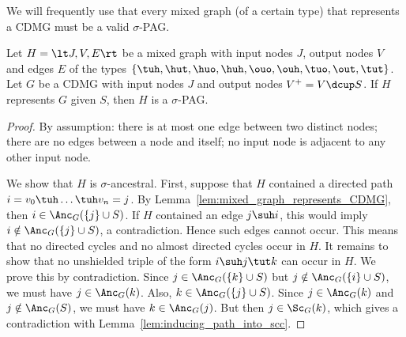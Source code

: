 We will frequently use that every mixed graph (of a certain type) that represents a CDMG must be a valid $\sigma$-PAG.
\begin{Prp}\label{prp:sigmapag_represents_cdmg_is_valid}
  Let $H = \lt J,V,E\rt$ be a mixed graph with input nodes $J$, output nodes $V$ and edges $E$ of the types $\{\tuh,\hut,\huo,\huh,\ouo,\ouh,\tuo,\out,\tut\}$.
  Let $G$ be a CDMG with input nodes $J$ and output nodes $V^+ = V \dcup S$.
  If $H$ represents $G$ given $S$, then $H$ is a $\sigma$-PAG.
\end{Prp}
\begin{proof}
  By assumption: there is at most one edge between two distinct nodes; there are no edges between a node and itself;
  no input node is adjacent to any other input node. 
  
  We show that $H$ is $\sigma$-ancestral. 
  First, suppose that $H$ contained a directed path $i = v_0 \tuh \dots \tuh v_n = j$.
  By Lemma~\ref{lem:mixed_graph_represents_CDMG}, then $i \in \Anc_G(\{j\} \cup S)$.
  If $H$ contained an edge $j \suh i$, this would imply $i \notin \Anc_G(\{j\} \cup S)$, a contradiction. 
  Hence such edges cannot occur.
  This means that no directed cycles and no almost directed cycles occur in $H$.
  It remains to show that no unshielded triple of the form $i \suh j \tut k$ can occur in $H$.
  We prove this by contradiction.
  Since $j \in \Anc_G(\{k\} \cup S)$ but $j \notin \Anc_G(\{i\} \cup S)$, we must have $j \in \Anc_G(k)$.
  Also, $k \in \Anc_G(\{j\} \cup S)$.
  Since $j \in \Anc_G(k)$ and $j \notin \Anc_G(S)$, we must have $k \in \Anc_G(j)$.
  But then $j \in \Sc_G(k)$, which gives a contradiction with Lemma~\ref{lem:inducing_path_into_scc}.


\end{proof}

